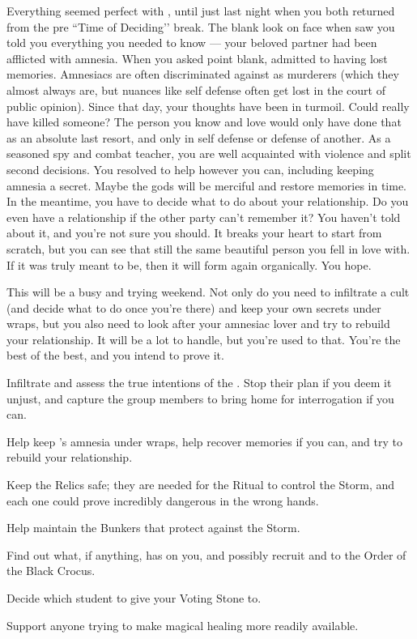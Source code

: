 \documentclass[char]{GL2020}
\begin{document}
Everything seemed perfect with \cLibrarian{}, until just last night when you both returned from the pre ``Time of Deciding’’ break. The blank look on \cLibrarian{\their} face when \cLibrarian{\they} saw you told you everything you needed to know — your beloved partner had been afflicted with amnesia. When you asked \cLibrarian{\them} point blank, \cLibrarian{\they} admitted to having lost \cLibrarian{\their} memories. Amnesiacs are often discriminated against as murderers (which they almost always are, but nuances like self defense often get lost in the court of public opinion). Since that day, your thoughts have been in turmoil. Could \cLibrarian{} really have killed someone? The person you know and love would only have done that as an absolute last resort, and only in self defense or defense of another. As a seasoned spy and combat teacher, you are well acquainted with violence and split second decisions. You resolved to help \cLibrarian{} however you can, including keeping \cLibrarian{\their} amnesia a secret. Maybe the gods will be merciful and restore \cLibrarian{\their} memories in time. In the meantime, you have to decide what to do about your relationship. Do you even have a relationship if the other party can't remember it? You haven't told \cLibrarian{\them} about it, and you're not sure you should. It breaks your heart to start from scratch, but you can see that \cLibrarian{\they} \cLibrarian{\are} still the same beautiful person you fell in love with. If it was truly meant to be, then it will form again organically. You hope.  

This will be a busy and trying weekend. Not only do you need to infiltrate a cult (and decide what to do once you're there) and keep your own secrets under wraps, but you also need to look after your amnesiac lover and try to rebuild your relationship. It will be a lot to handle, but you're used to that. You're the best of the best, and you intend to prove it.

\begin{itemz}
    \item Infiltrate and assess the true intentions of the \pGoaties{}. Stop their plan if you deem it unjust, and capture the group members to bring home for interrogation if you can.
    \item Help keep \cLibrarian{}'s amnesia under wraps, help \cLibrarian{\them} recover \cLibrarian{\their} memories if you can, and try to rebuild your relationship.
    \item Keep the Relics safe; they are needed for the Ritual to control the Storm, and each one could prove incredibly dangerous in the wrong hands.
    \item Help \cBunker{} maintain the Bunkers that protect against the Storm.
    \item Find out what, if anything, \cLibAssist{} has on you, and possibly recruit \cLibAssist{\them} and\backslashor \cPirateChild{} to the Order of the Black Crocus.
    \item Decide which student to give your Voting Stone to.
    \item Support anyone trying to make magical healing more readily available.
\end{itemz}
\end{document}
